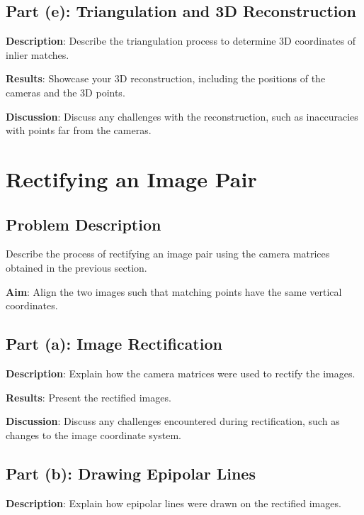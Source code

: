 \documentclass{article}
\begin{document}
\subsection{Part (e): Triangulation and 3D Reconstruction}
\textbf{Description}: Describe the triangulation process to determine 3D coordinates of inlier matches.

\textbf{Results}: Showcase your 3D reconstruction, including the positions of the cameras and the 3D points.


\textbf{Discussion}: Discuss any challenges with the reconstruction, such as inaccuracies with points far from the cameras.

\section{Rectifying an Image Pair}

\subsection{Problem Description}
Describe the process of rectifying an image pair using the camera matrices obtained in the previous section.

\textbf{Aim}: Align the two images such that matching points have the same vertical coordinates.

\subsection{Part (a): Image Rectification}
\textbf{Description}: Explain how the camera matrices were used to rectify the images.

\textbf{Results}: Present the rectified images.


\textbf{Discussion}: Discuss any challenges encountered during rectification, such as changes to the image coordinate system.

\subsection{Part (b): Drawing Epipolar Lines}
\textbf{Description}: Explain how epipolar lines were drawn on the rectified images.
\end{document}
